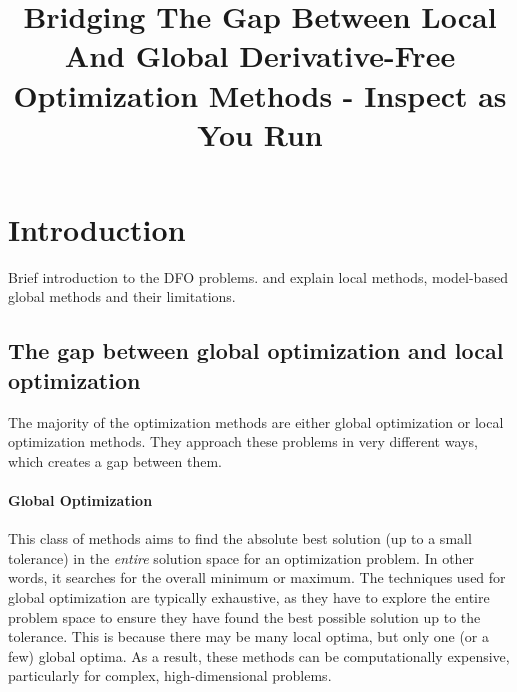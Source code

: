 \documentclass[sn-mathphys,Numbered]{sn-jnl}
\theoremstyle{thmstyleone}
\theoremstyle{thmstyletwo}
\theoremstyle{thmstylethree}
\begin{document}
\title[Inspect]{Bridging The Gap Between Local And Global Derivative-Free Optimization Methods - Inspect as You Run}

\author[1]{ }

\author*[2]{ }






\maketitle
\section{Introduction}
Brief introduction to the DFO problems. and explain local methods, model-based global methods and their limitations.

\subsection{The gap between global optimization and local optimization}
The majority of the optimization methods are either global optimization or local optimization methods. They approach these problems in very different ways, which creates a gap between them. 

\paragraph{Global Optimization} This class of methods aims to find the absolute best solution (up to a small tolerance) in the \emph{entire} solution space for an optimization problem. In other words, it searches for the overall minimum or maximum. The techniques used for global optimization are typically exhaustive, as they have to explore the entire problem space to ensure they have found the best possible solution up to the tolerance. This is because there may be many local optima, but only one (or a few) global optima. As a result, these methods can be computationally expensive, particularly for complex, high-dimensional problems.
\end{document}
